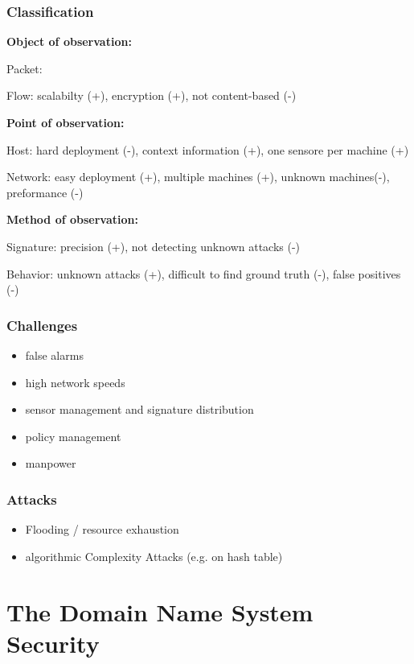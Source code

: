 \documentclass[fs, footer]{latex4ei}
\begin{document}
\begin{multicols*}{4}
{\subsubsection{Classification}
\textbf{Object of observation:}

Packet:

Flow: scalabilty (+), encryption (+), not content-based (-)

\textbf{Point of observation:}

Host: hard deployment (-), context information (+), one sensore per machine (+)

Network: easy deployment (+), multiple machines (+), unknown machines(-), preformance (-)

\textbf{Method of observation:}

Signature: precision (+), not detecting unknown attacks (-)

Behavior: unknown attacks (+), difficult to find ground truth (-), false positives (-)

\subsubsection{Challenges}
\begin{itemize}
 	\item false alarms
 	\item high network speeds
 	\item sensor management and signature distribution
 	\item policy management
 	\item manpower
 \end{itemize}

 \subsubsection{Attacks}
 \begin{itemize}
 	\item Flooding / resource exhaustion
 	\item algorithmic Complexity Attacks (e.g. on hash table)

 \end{itemize}
}

\section{The Domain Name System Security}
\end{multicols*}
\end{document}
